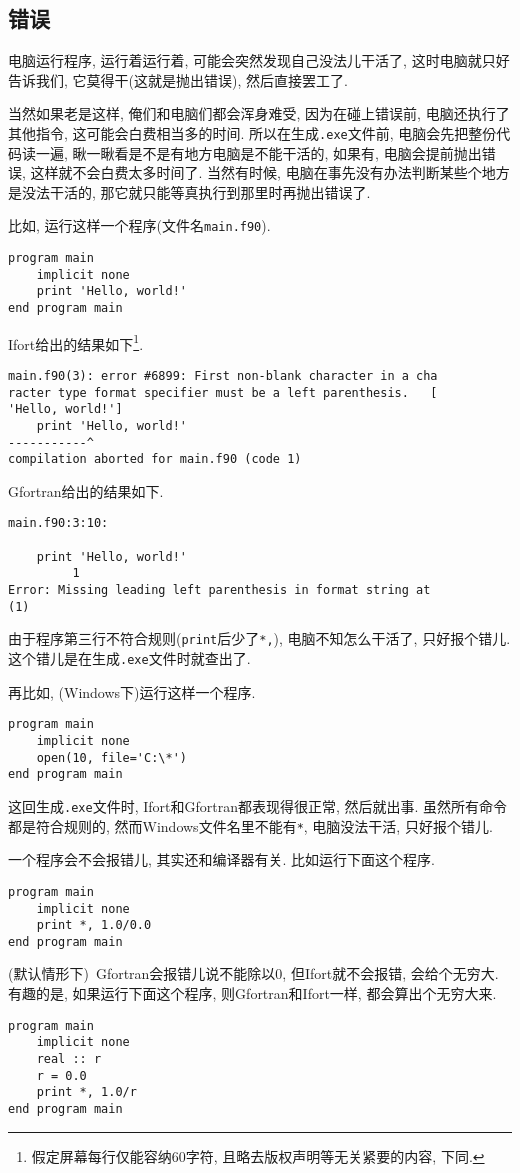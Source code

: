 \subsection{错误}\label{fortran_error}

电脑运行程序, 运行着运行着, 可能会突然发现自己没法儿干活了, 这时电脑就只好告诉我们, 它莫得干(这就是抛出错误), 然后直接罢工了.

当然如果老是这样, 俺们和电脑们都会浑身难受, 因为在碰上错误前, 电脑还执行了其他指令, 这可能会白费相当多的时间. 所以在生成\texttt{.exe}文件前, 电脑会先把整份代码读一遍, 瞅一瞅看是不是有地方电脑是不能干活的, 如果有, 电脑会提前抛出错误, 这样就不会白费太多时间了. 当然有时候, 电脑在事先没有办法判断某些个地方是没法干活的, 那它就只能等真执行到那里时再抛出错误了.

比如, 运行这样一个程序(文件名\texttt{main.f90}).
\begin{lstlisting}
program main
    implicit none
    print 'Hello, world!'
end program main
\end{lstlisting}

Ifort给出的结果如下\footnote{
    假定屏幕每行仅能容纳60字符, 且略去版权声明等无关紧要的内容, 下同.
}.
\begin{lstlisting}
main.f90(3): error #6899: First non-blank character in a cha
racter type format specifier must be a left parenthesis.   [
'Hello, world!']
    print 'Hello, world!'
-----------^
compilation aborted for main.f90 (code 1)
\end{lstlisting}

Gfortran给出的结果如下.
\begin{lstlisting}
main.f90:3:10:

    print 'Hello, world!'
         1
Error: Missing leading left parenthesis in format string at 
(1)
\end{lstlisting}

由于程序第三行不符合规则(\texttt{print}后少了\texttt{*,}), 电脑不知怎么干活了, 只好报个错儿. 这个错儿是在生成\texttt{.exe}文件时就查出了.

再比如, (Windows下)运行这样一个程序.
\begin{lstlisting}
program main
    implicit none
    open(10, file='C:\*')
end program main
\end{lstlisting}

这回生成\texttt{.exe}文件时, Ifort和Gfortran都表现得很正常, 然后就出事. 虽然所有命令都是符合规则的, 然而Windows文件名里不能有\texttt{*}, 电脑没法干活, 只好报个错儿.

一个程序会不会报错儿, 其实还和编译器有关. 比如运行下面这个程序.
\begin{lstlisting}
program main
    implicit none
    print *, 1.0/0.0
end program main
\end{lstlisting}
(默认情形下)~Gfortran会报错儿说不能除以0, 但Ifort就不会报错, 会给个无穷大. 有趣的是, 如果运行下面这个程序, 则Gfortran和Ifort一样, 都会算出个无穷大来.
\begin{lstlisting}
program main
    implicit none
    real :: r
    r = 0.0
    print *, 1.0/r
end program main
\end{lstlisting}

